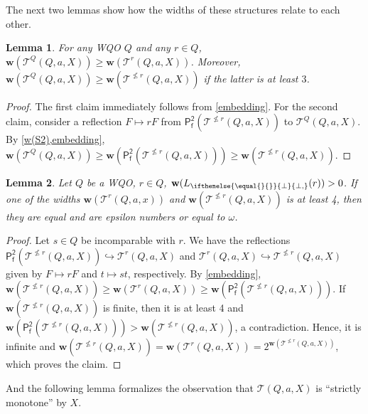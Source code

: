 \documentclass[10pt,a4paper]{amsart}
\let \nleq \nleqslant
\let \geq \geqslant
\let \embeds \hookrightarrow
\newcommand \K [2][]{L_{\ifthenelse{\equal{#1}{}}{\bot}{\bot,#1}}(#2)}
\renewcommand \k [2][]{\w(\K[#1]{#2})}
\renewcommand \S [1][]{\mathsf{P_f^{#1}}}
\def \T {\mathcal{T}}
\def \w {\textbf{w}}
\newtheorem{lemma}{Lemma}
\begin{document}
The next two lemmas show how the widths of these structures relate to each other.

\begin{lemma}\label{restrict the root}
    For any WQO $Q$ and any $r \in Q$, $\w(\T^Q(Q, a, X)) \geq \w(\T^r(Q, a, X))$. Moreover, $\w(\T^Q(Q, a, X)) \geq \w(\T^{\nleq r}(Q, a, X))$ if the latter is at least $3$.
\end{lemma}
\begin{proof}
    The first claim immediately follows from \cref{embedding}. For the second claim, consider a reflection $F \mapsto rF$ from $\S[2](\T^{\nleq r}(Q, a, X))$ to $\T^Q(Q, a, X)$. By \cref{w(S2),embedding}, $\w(\T^Q(Q, a, X)) \geq \w(\S[2](\T^{\nleq r}(Q, a, X))) \geq \w(\T^{\nleq r}(Q, a, X))$.
\end{proof}

\begin{lemma}\label{w(T) is epsilon}
    Let $Q$ be a WQO, $r \in Q$, $\k{r} > 0$. If one of the widths $\w(\T^r(Q, a, x))$ and $\w(\T^{\nleq r}(Q, a, X))$ is at least 4, then they are equal and are epsilon numbers or equal to $\omega$.
\end{lemma}
\begin{proof}
    Let $s \in Q$ be incomparable with $r$. We have the reflections $\S[2](\T^{\nleq r}(Q, a, X)) \embeds \T^r(Q, a, X)$ and $\T^r(Q, a, X) \embeds \T^{\nleq r}(Q, a, X)$ given by $F \mapsto rF$ and $t \mapsto st$, respectively. By \cref{embedding}, $\w(\T^{\nleq r}(Q, a, X)) \geq \w(\T^r(Q, a, X)) \geq \w(\S[2](\T^{\nleq r}(Q, a, X)))$. If $\w(\T^{\nleq r}(Q, a, X))$ is finite, then it is at least 4 and $\w(\S[2](\T^{\nleq r}(Q, a, X))) > \w(\T^{\nleq r}(Q, a, X))$, a contradiction. Hence, it is infinite and $\w(\T^{\nleq r}(Q, a, X)) = \w(\T^r(Q, a, X)) =2^{\w(\T^{\nleq r}(Q, a, X))}$, which proves the claim.
\end{proof}

And the following lemma formalizes the observation that $\T(Q, a, X)$ is ``strictly monotone'' by $X$.
\end{document}
